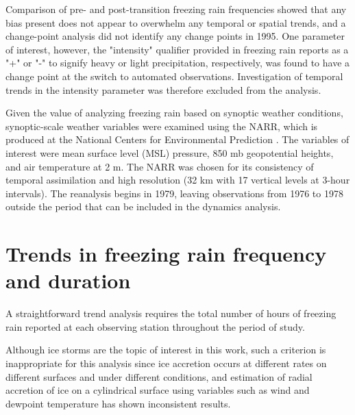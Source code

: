 \documentclass[twocol]{ametsoc}
\begin{document}
Comparison of pre- and post-transition freezing rain frequencies showed that any bias present does not appear to overwhelm any temporal or spatial trends, and a change-point analysis did not identify any change points in 1995. One parameter of interest, however, the "intensity" qualifier provided in freezing rain reports as a "+" or "-" to signify heavy or light precipitation, respectively, was found to have a change point at the switch to automated observations. Investigation of temporal trends in the intensity parameter was therefore excluded from the analysis.

Given the value of analyzing freezing rain based on synoptic weather conditions, synoptic-scale weather variables were examined using the NARR, which is produced at the National Centers for Environmental Prediction \citep{mesinger2006north}. The variables of interest were mean surface level (MSL) pressure, 850 mb geopotential heights, and air temperature at 2 m. The NARR was chosen for its consistency of temporal assimilation and high resolution (32 km with 17 vertical levels at 3-hour intervals). The reanalysis begins in 1979, leaving observations from 1976 to 1978 outside the period that can be included in the dynamics analysis.


\section{Trends in freezing rain frequency and duration}
A straightforward trend analysis requires the total number of hours of freezing rain reported at each observing station throughout the period of study.  

Although ice storms are the topic of interest in this work, such a criterion is inappropriate for this analysis since ice accretion occurs at different rates on different surfaces and under different conditions, and estimation of radial accretion of ice on a cylindrical surface using variables such as wind and dewpoint temperature has shown inconsistent results. 
\end{document}
